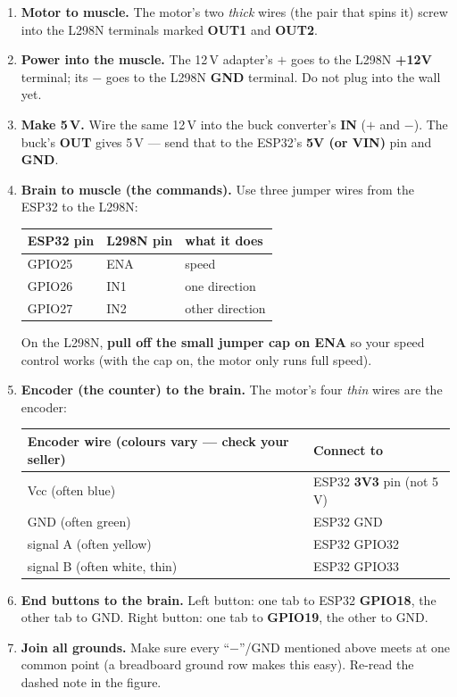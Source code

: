 \documentclass[11pt,a4paper]{article}
\begin{document}
\begin{enumerate}[leftmargin=*,itemsep=3pt]
  \item \textbf{Motor to muscle.} The motor's two \emph{thick} wires (the pair that spins it) screw into
  the L298N terminals marked \textbf{OUT1} and \textbf{OUT2}.
  \item \textbf{Power into the muscle.} The 12\,V adapter's $+$ goes to the L298N \textbf{+12V} terminal;
  its $-$ goes to the L298N \textbf{GND} terminal. Do not plug into the wall yet.
  \item \textbf{Make 5\,V.} Wire the same 12\,V into the buck converter's \textbf{IN} ($+$ and $-$). The
  buck's \textbf{OUT} gives 5\,V --- send that to the ESP32's \textbf{5V (or VIN)} pin and \textbf{GND}.
  \item \textbf{Brain to muscle (the commands).} Use three jumper wires from the ESP32 to the L298N:
  \begin{center}\small
  \begin{tabular}{@{}lll@{}}
  \toprule
  ESP32 pin & L298N pin & what it does\\
  \midrule
  GPIO25 & ENA & speed\\
  GPIO26 & IN1 & one direction\\
  GPIO27 & IN2 & other direction\\
  \bottomrule
  \end{tabular}
  \end{center}
  On the L298N, \textbf{pull off the small jumper cap on ENA} so your speed control works (with the cap
  on, the motor only runs full speed).
  \item \textbf{Encoder (the counter) to the brain.} The motor's four \emph{thin} wires are the encoder:
  \begin{center}\small
  \begin{tabular}{@{}ll@{}}
  \toprule
  Encoder wire (colours vary --- check your seller) & Connect to\\
  \midrule
  Vcc (often blue) & ESP32 \textbf{3V3} pin (not 5\,V)\\
  GND (often green) & ESP32 GND\\
  signal A (often yellow) & ESP32 GPIO32\\
  signal B (often white, thin) & ESP32 GPIO33\\
  \bottomrule
  \end{tabular}
  \end{center}
  \item \textbf{End buttons to the brain.} Left button: one tab to ESP32 \textbf{GPIO18}, the other tab to
  GND. Right button: one tab to \textbf{GPIO19}, the other to GND.
  \item \textbf{Join all grounds.} Make sure every ``$-$''/GND mentioned above meets at one common point
  (a breadboard ground row makes this easy). Re-read the dashed note in the figure.
\end{enumerate}
\end{document}

